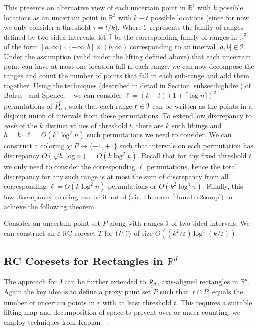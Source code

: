 \documentclass[11pt]{myclass}
\newcommand{\eps}{\varepsilon}
\newcommand{\Eu}[1]{\ensuremath{\EuScript{#1}}}
\newcommand{\bl}[1]{\ensuremath{\mathbb{#1}}}
\newcommand{\cert}{\textsf{cert}}
\newcommand{\RC}{\textsf{RC}\xspace}
\begin{document}
This presents an alternative view of each uncertain point in $\bl{R}^1$ with $k$ possible locations as an uncertain point in $\bl{R}^3$ with $k-t$ possible locations (since for now we only consider a threshold $\tau = t/k$).  Where $\Eu{I}$ represents the family of ranges defined by two-sided intervals, let $\bar{\Eu{I}}$ be the corresponding family of ranges in $\bl{R}^3$ of the form $[a,\infty) \times (-\infty,b] \times (b, \infty)$ corresponding to an interval $[a,b] \in \Eu{I}$.  Under the assumption (valid under the lifting defined above) that each uncertain point can have at most one location fall in each range, we can now decompose the ranges and count the number of points that fall in each sub-range and add them together.  
Using the techniques (described in detail in Section \ref{subsec:highdre}) of Bohus~\cite{bohus} and Spencer \etal~\cite{spencer} we can consider $\ell =(k-t) (1+\lceil \log n \rceil)^2$ permutations of $\bar{P}_\cert^t$ such that each range $\bar{r} \in \bar{\Eu{I}}$ can be written as the points in a disjoint union of intervals from these permutations.  
To extend low discrepancy to \emph{each} of the $k$ distinct values of threshold $t$, there are $k$ such liftings and $h = k\cdot \ell = O(k^2 \log^2 n)$ such permutations we need to consider.   We can construct a coloring $\chi : P \to \{-1,+1\}$ such that intervals on each permutation has discrepancy $O(\sqrt{h} \log n) = O(k \log^2 n )$. Recall that for any fixed threshold $t$ we only need to consider the corresponding $\ell$ permutations, hence the total discrepancy for any such range is at most the sum of discrepancy from all corresponding 
$\ell=O( k \log^2 n)$ permutations or $O(k^2 \log^4 n)$.  
Finally, this low-discrepancy coloring can be iterated (via Theorem \ref{thm:disc2samp}) to achieve the following theorem.  

\begin{theorem}\label{thm:rcsample1d}
Consider an uncertain point set $P$ along with ranges $\Eu{I}$ of two-sided intervals.  We can construct an $\eps$-RC coreset $T$ for $(P,\Eu{I})$ of size $O((k^2 /\eps) \log^4 (k/\eps))$.  
\end{theorem}
 


\subsection{\RC Coresets for Rectangles in $\bl{R}^d$}

The approach for $\Eu{I}$ can be further extended to $\Eu{R}_d$, axis-aligned rectangles in $\bl{R}^d$. Again the key idea
is to define a proxy point set $\bar{P}$ such that $| \bar r \cap \bar{P}|$ equals the number of uncertain points in $r$ with
at least threshold $t$. This requires a suitable lifting map and decomposition of space to prevent over or under counting;
we employ techniques from Kaplan \etal~\cite{colors}.
\end{document}
